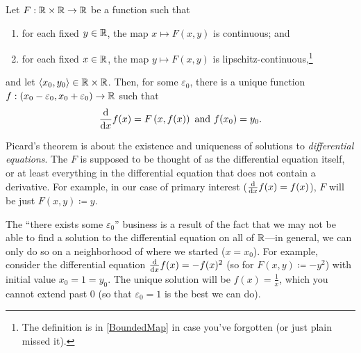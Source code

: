 \begin{thm}\label{PicardsExistenceTheorem}
Let $F:\mathbb{R} \times \mathbb{R} \rightarrow \mathbb{R}$ be a function such that
\begin{enumerate}
\item for each fixed $y\in \mathbb{R}$, the map $x\mapsto F(x,y)$ is continuous; and
\item for each fixed $x\in \mathbb{R}$, the map $y\mapsto F(x,y)$ is lipschitz-continuous,\footnote{The definition is in \cref{BoundedMap} in case you've forgotten (or just plain missed it).}
\end{enumerate}
and let $\langle x_0,y_0\rangle\in \mathbb{R} \times \mathbb{R}$.  Then, for some $\varepsilon _0$, there is a unique function $f:(x_0-\varepsilon _0,x_0+\varepsilon _0)\rightarrow \mathbb{R}$ such that
\begin{equation}
\frac{\mathop{}\!\mathrm{d}}{\mathop{}\!\mathrm{d} x}f(x)=F\left( x,f(x)\right) \text{ and }f(x_0)=y_0.
\end{equation}
\begin{rmk}
Picard's theorem is about the existence and uniqueness of solutions to \emph{differential equations}.  The $F$ is supposed to be thought of as the differential equation itself, or at least everything in the differential equation that does not contain a derivative.  For example, in our case of primary interest ($\frac{\mathop{}\!\mathrm{d}}{\mathop{}\!\mathrm{d} x}f(x)=f(x)$), $F$ will be just $F(x,y)\coloneqq y$.
\end{rmk}
\begin{rmk}
The ``there exists some $\varepsilon _0$'' business is a result of the fact that we may not be able to find a solution to the differential equation on all of $\mathbb{R}$---in general, we can only do so on a neighborhood of where we started ($x=x_0$).  For example, consider the differential equation $\frac{\mathop{}\!\mathrm{d}}{\mathop{}\!\mathrm{d} x}f(x)=-f(x)^2$ (so for $F(x,y)\coloneqq -y^2$) with initial value $x_0=1=y_0$.  The unique solution will be $f(x)=\frac{1}{x}$, which you cannot extend past $0$ (so that $\varepsilon _0=1$ is the best we can do).
\end{rmk}
\end{thm}
